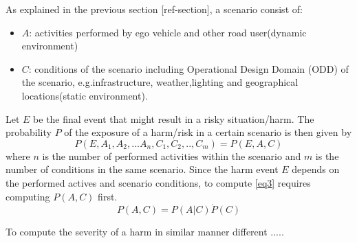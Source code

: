 As explained in the previous section [ref-section], a scenario consist of:
\begin{itemize}
\item $A$: activities performed by ego vehicle and other road user(dynamic environment)
\item $C$: conditions of the scenario including Operational Design Domain (ODD) of the scenario, e.g.infrastructure, weather,lighting and geographical locations(static environment).
\end{itemize}
Let $E$ be the final event that might result in a risky situation/harm. The probability $P$ of the exposure of a harm/risk in a certain scenario is then given by 
\begin{equation}
P(E,A_1,A_2,...A_n,C_1,C_2,..,C_m)=P(E,A,C) \label{eq:secM1}
\end{equation}
where $n$ is the number of performed activities within the scenario and $m$ is the number of conditions in the same scenario.
Since the harm event $E$ depends on the performed actives and scenario conditions, to compute \ref{eq3} requires computing $P(A,C)$ first.
\begin{equation}
P(A,C)=P(A|C)\dot P(C) \label{eq:secM2}
\end{equation}

To compute the severity of a harm in similar manner different .....

